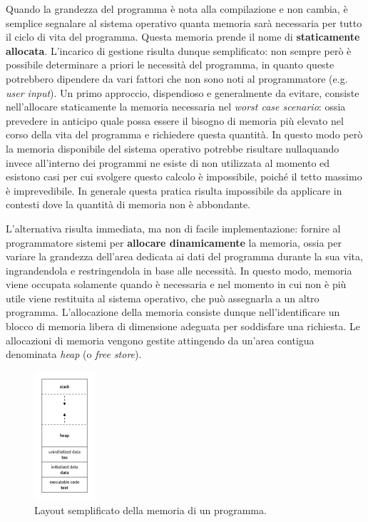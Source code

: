 Quando la grandezza del programma è nota alla compilazione e non cambia, è semplice segnalare al sistema operativo quanta memoria sarà necessaria per tutto il ciclo di vita del programma. Questa memoria prende il nome di \textbf{staticamente allocata}. L'incarico di gestione risulta dunque semplificato: non sempre però è possibile determinare a priori le necessità del programma, in quanto queste potrebbero dipendere da vari fattori che non sono noti al programmatore (e.g. \textit{user input}). Un primo approccio, dispendioso e generalmente da evitare, consiste nell'allocare staticamente la memoria necessaria nel \textit{worst case scenario}: ossia prevedere in anticipo quale possa essere il bisogno di memoria più elevato nel corso della vita del programma e richiedere questa quantità. In questo modo però la memoria disponibile del sistema operativo potrebbe risultare nulla\footnotemark quando invece all'interno dei programmi ne esiste di non utilizzata al momento ed esistono casi per cui svolgere questo calcolo è impossibile, poiché il tetto massimo è imprevedibile. In generale questa pratica risulta impossibile da applicare in contesti dove la quantità di memoria non è abbondante.


L'alternativa risulta immediata, ma non di facile implementazione: fornire al programmatore sistemi per \textbf{allocare dinamicamente} la memoria, ossia per variare la grandezza dell'area dedicata ai dati del programma durante la sua vita, ingrandendola e restringendola in base alle necessità. In questo modo, memoria viene occupata solamente quando è necessaria e nel momento in cui non è più utile viene restituita al sistema operativo, che può assegnarla a un altro programma. L'allocazione della memoria consiste dunque nell'identificare un blocco di memoria libera di dimensione adeguata per soddisfare una richiesta. Le allocazioni di memoria vengono gestite attingendo da un'area contigua denominata \textit{heap} (o \textit{free store}). 

\begin{figure}[H]
  \centering
  \includegraphics[width=0.2\textwidth]{images/program_memory_layout.png}
  \caption{Layout semplificato della memoria di un programma.}
  \label{fig:program_memory_layout}
\end{figure}

